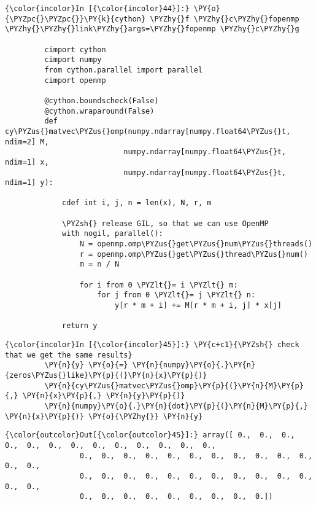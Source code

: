     \begin{Verbatim}[commandchars=\\\{\}]
{\color{incolor}In [{\color{incolor}44}]:} \PY{o}{\PYZpc{}\PYZpc{}}\PY{k}{cython} \PYZhy{}f \PYZhy{}c\PYZhy{}fopenmp \PYZhy{}\PYZhy{}link\PYZhy{}args=\PYZhy{}fopenmp \PYZhy{}c\PYZhy{}g
         
         cimport cython
         cimport numpy
         from cython.parallel import parallel
         cimport openmp
         
         @cython.boundscheck(False)
         @cython.wraparound(False)
         def cy\PYZus{}matvec\PYZus{}omp(numpy.ndarray[numpy.float64\PYZus{}t, ndim=2] M, 
                           numpy.ndarray[numpy.float64\PYZus{}t, ndim=1] x, 
                           numpy.ndarray[numpy.float64\PYZus{}t, ndim=1] y):
         
             cdef int i, j, n = len(x), N, r, m
         
             \PYZsh{} release GIL, so that we can use OpenMP
             with nogil, parallel():
                 N = openmp.omp\PYZus{}get\PYZus{}num\PYZus{}threads()
                 r = openmp.omp\PYZus{}get\PYZus{}thread\PYZus{}num()
                 m = n / N
                 
                 for i from 0 \PYZlt{}= i \PYZlt{} m:
                     for j from 0 \PYZlt{}= j \PYZlt{} n:
                         y[r * m + i] += M[r * m + i, j] * x[j]
         
             return y
\end{Verbatim}

    \begin{Verbatim}[commandchars=\\\{\}]
{\color{incolor}In [{\color{incolor}45}]:} \PY{c+c1}{\PYZsh{} check that we get the same results}
         \PY{n}{y} \PY{o}{=} \PY{n}{numpy}\PY{o}{.}\PY{n}{zeros\PYZus{}like}\PY{p}{(}\PY{n}{x}\PY{p}{)}
         \PY{n}{cy\PYZus{}matvec\PYZus{}omp}\PY{p}{(}\PY{n}{M}\PY{p}{,} \PY{n}{x}\PY{p}{,} \PY{n}{y}\PY{p}{)}
         \PY{n}{numpy}\PY{o}{.}\PY{n}{dot}\PY{p}{(}\PY{n}{M}\PY{p}{,} \PY{n}{x}\PY{p}{)} \PY{o}{\PYZhy{}} \PY{n}{y}
\end{Verbatim}

            \begin{Verbatim}[commandchars=\\\{\}]
{\color{outcolor}Out[{\color{outcolor}45}]:} array([ 0.,  0.,  0.,  0.,  0.,  0.,  0.,  0.,  0.,  0.,  0.,  0.,  0.,
                 0.,  0.,  0.,  0.,  0.,  0.,  0.,  0.,  0.,  0.,  0.,  0.,  0.,
                 0.,  0.,  0.,  0.,  0.,  0.,  0.,  0.,  0.,  0.,  0.,  0.,  0.,
                 0.,  0.,  0.,  0.,  0.,  0.,  0.,  0.,  0.])
\end{Verbatim}
        
